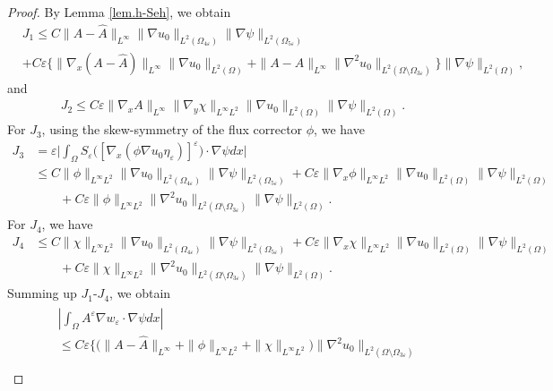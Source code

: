 \documentclass[reqno,12pt]{amsart} %
\theoremstyle{definition}
\theoremstyle{remark}
\numberwithin{equation}{section}
\newcommand{\e}{\varepsilon}
\begin{document}
\begin{proof}
    By Lemma \ref{lem.h-Seh}, we obtain
    \begin{align*}
        &J_1 \le  C \|A-\widehat{A}\|_{L^\infty} \|\nabla u_0\|_{L^2(\Omega_{4\varepsilon})} \|\nabla\psi\|_{L^2(\Omega_{5\varepsilon})}\\
         & + C\varepsilon\big\{\|\nabla_x(A-\widehat{A})\|_{L^\infty}\| \nabla u_0\|_{L^2(\Omega)} + \|A-\widehat{A}\|_{L^\infty} \|\nabla^2u_0\|_{L^2(\Omega\setminus\Omega_{3\varepsilon})}\big\} \|\nabla\psi\|_{L^2(\Omega)},
    \end{align*}
    and
    \begin{align*}
        J_2 \le C\varepsilon\|\nabla_xA\|_{L^\infty}\|\nabla_y\chi\|_{L^\infty L^2}  \|\nabla u_0\|_{L^2(\Omega)} \|\nabla\psi\|_{L^2(\Omega)}.
    \end{align*}
    For $J_3$, using the skew-symmetry of the flux corrector $\phi$, we have
    \begin{equation*}
    \begin{aligned}
        J_3 & = \e \bigg| \int_{\Omega} S_\e\big( [\nabla_x( \phi \nabla u_0 \eta_\e)]^\e \big) \cdot \nabla \psi dx \bigg| \\
        & \le C\|\phi\|_{L^\infty L^2} \|\nabla u_0\|_{L^2(\Omega_{4\varepsilon})} \|\nabla\psi\|_{L^2(\Omega_{5\varepsilon})} + C \varepsilon \|\nabla_x\phi\|_{L^\infty L^2} \|\nabla u_0\|_{L^2(\Omega)} \|\nabla\psi\|_{L^2(\Omega)}\\ 
        &\qquad + C\varepsilon \|\phi\|_{L^\infty L^2} \|\nabla^2u_0\|_{L^2(\Omega\setminus\Omega_{3\varepsilon})} \|\nabla\psi\|_{L^2(\Omega)}.
    \end{aligned}
    \end{equation*}
    For $J_4$, we have
    \begin{align*}
        J_4 & \le C\|\chi \|_{L^\infty L^2} \|\nabla u_0\|_{L^2(\Omega_{4\varepsilon})} \|\nabla\psi\|_{L^2(\Omega_{5\varepsilon})} + C \varepsilon \|\nabla_x\chi\|_{L^\infty L^2} \|\nabla u_0\|_{L^2(\Omega)} \|\nabla\psi\|_{L^2(\Omega)}\\ 
        &\qquad + C\varepsilon \|\chi \|_{L^\infty L^2} \|\nabla^2u_0\|_{L^2(\Omega\setminus\Omega_{3\varepsilon})} \|\nabla\psi\|_{L^2(\Omega)}.
    \end{align*}
    Summing up $J_1$-$J_4$, we obtain
    \begin{align}\label{es_wpsi}
    \begin{split}
        & \left|\int_\Omega A^\varepsilon\nabla w_\varepsilon\cdot\nabla\psi dx\right|\\
        & \leq C\varepsilon\Big\{\big(\|A-\widehat{A}\|_{L^\infty}+\|\phi\|_{L^\infty L^2}+\|\chi\|_{L^\infty L^2}\big)\|\nabla^2u_0\|_{L^2(\Omega\setminus\Omega_{3\varepsilon})}\\

\end{split}
\end{align}
\end{proof}
\end{document}
